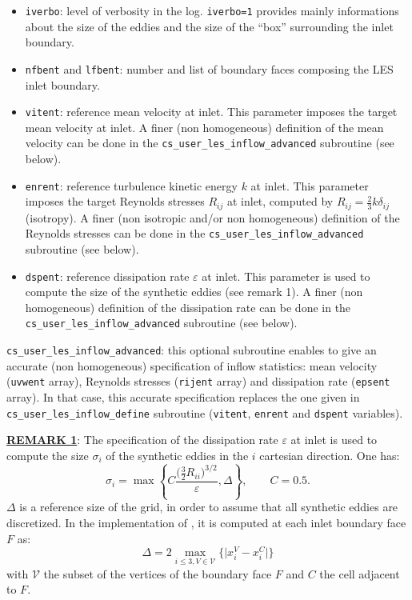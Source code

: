 {{{\begin{itemize}
\item \texttt{iverbo}: level of verbosity in the
  log. \texttt{iverbo=1} provides mainly informations about the
  size of the eddies and the size of the ``box'' surrounding the inlet
  boundary.

\item \texttt{nfbent} and \texttt{lfbent}: number and list of boundary
  faces composing the LES inlet boundary.

\item \texttt{vitent}: reference mean velocity at inlet. This
  parameter imposes the target mean velocity at inlet. A finer (non
  homogeneous) definition of the mean velocity can be done in the
  \texttt{cs\_user\_les\_inflow\_advanced} subroutine (see below).

\item \texttt{enrent}: reference turbulence kinetic energy $k$ at
  inlet. This parameter imposes the target Reynolds stresses $R_{ij}$
  at inlet, computed by $R_{ij}=\frac{2}{3}k\delta_{ij}$ (isotropy). A
  finer (non isotropic and/or non homogeneous) definition of the
  Reynolds stresses can be done in the
  \texttt{cs\_user\_les\_inflow\_advanced} subroutine (see below).

\item \texttt{dspent}: reference dissipation rate $\varepsilon$ at
  inlet. This parameter is used to compute the size of the synthetic
  eddies (see remark 1). A finer (non homogeneous) definition of
  the dissipation rate can be done in the
  \texttt{cs\_user\_les\_inflow\_advanced} subroutine (see below).
\end{itemize}

\texttt{cs\_user\_les\_inflow\_advanced}: this optional subroutine
enables to give an accurate (non homogeneous) specification of inflow
statistics: mean velocity (\texttt{uvwent} array), Reynolds stresses
(\texttt{rijent} array) and dissipation rate (\texttt{epsent}
array). In that case, this accurate specification replaces the
one given in \texttt{cs\_user\_les\_inflow\_define} subroutine
(\texttt{vitent}, \texttt{enrent} and \texttt{dspent} variables).

{\bf \underline{REMARK 1}}: The specification of the dissipation rate
$\varepsilon$ at inlet is used to compute the size $\sigma_i$ of the
synthetic eddies in the $i$ cartesian direction. One has:
$$\sigma_i=\max\left\{C\frac{\big(\frac{3}{2}R_{ii}\big)^{3/2}}{\varepsilon},\Delta\right\},\qquad
C=0.5.$$
$\Delta$ is a reference size of the grid, in order to assume that all
synthetic eddies are discretized. In the implementation of \CS, it is
computed at each inlet boundary face $F$ as:
$$\Delta=2\max_{i\le3,V\in\mathcal{V}}\Big\{\big|x_i^V-x_i^C\big|\Big\}$$
with $\mathcal{V}$ the subset of the vertices of the boundary face $F$
and $C$ the cell adjacent to $F$.

}}}
